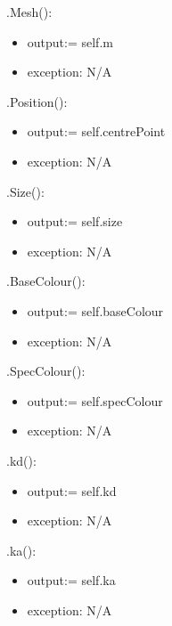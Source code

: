 \documentclass[12pt, titlepage]{article}
\begin{document}
\noindent .Mesh():
\begin{itemize}
	\item output:= self.m
	\item exception: N/A
\end{itemize}

\noindent .Position():
\begin{itemize}
	\item output:= self.centrePoint
	\item exception: N/A
\end{itemize}

\noindent .Size():
\begin{itemize}
	\item output:= self.size
	\item exception: N/A
\end{itemize}

\noindent .BaseColour():
\begin{itemize}
	\item output:= self.baseColour
	\item exception: N/A
\end{itemize}

\noindent .SpecColour():
\begin{itemize}
	\item output:= self.specColour
	\item exception: N/A
\end{itemize}

\noindent .kd():
\begin{itemize}
	\item output:= self.kd
	\item exception: N/A
\end{itemize}

\noindent .ka():
\begin{itemize}
	\item output:= self.ka
	\item exception: N/A
\end{itemize}
\end{document}
